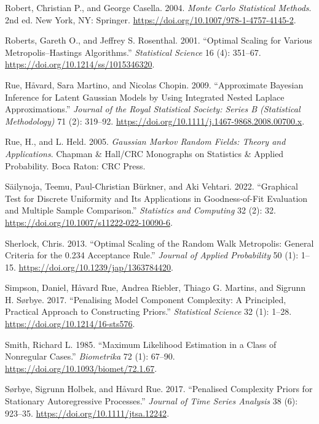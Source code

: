 \documentclass[
  11pt,
  letterpaper,
]{scrbook}
\newlength{\cslhangindent}
\newenvironment{CSLReferences}[2] %
 {\begin{list}{}{%
  \setlength{\itemindent}{0pt}
  \setlength{\leftmargin}{0pt}
  \setlength{\parsep}{0pt}
  \ifodd #1
   \setlength{\leftmargin}{\cslhangindent}
   \setlength{\itemindent}{-1\cslhangindent}
  \fi
  \setlength{\itemsep}{#2\baselineskip}}}
 {\end{list}}
\theoremstyle{plain}
\theoremstyle{plain}
\theoremstyle{definition}
\theoremstyle{definition}
\theoremstyle{definition}
\theoremstyle{plain}
\theoremstyle{remark}
\begin{document}
\begin{CSLReferences}{1}{0}
Robert, Christian P., and George Casella. 2004. \emph{{M}onte {C}arlo
Statistical Methods}. 2nd ed. New York, NY: Springer.
\url{https://doi.org/10.1007/978-1-4757-4145-2}.

Roberts, Gareth O., and Jeffrey S. Rosenthal. 2001. {``Optimal Scaling
for Various {M}etropolis--{H}astings Algorithms.''} \emph{Statistical
Science} 16 (4): 351--67. \url{https://doi.org/10.1214/ss/1015346320}.

Rue, Håvard, Sara Martino, and Nicolas Chopin. 2009. {``Approximate
Bayesian Inference for Latent {G}aussian Models by Using Integrated
Nested {L}aplace Approximations.''} \emph{Journal of the Royal
Statistical Society: Series B (Statistical Methodology)} 71 (2):
319--92. \url{https://doi.org/10.1111/j.1467-9868.2008.00700.x}.

Rue, H., and L. Held. 2005. \emph{{G}aussian {M}arkov Random Fields:
Theory and Applications}. Chapman \& Hall/CRC Monographs on Statistics
\& Applied Probability. Boca Raton: CRC Press.

Säilynoja, Teemu, Paul-Christian Bürkner, and Aki Vehtari. 2022.
{``Graphical Test for Discrete Uniformity and Its Applications in
Goodness-of-Fit Evaluation and Multiple Sample Comparison.''}
\emph{Statistics and Computing} 32 (2): 32.
\url{https://doi.org/10.1007/s11222-022-10090-6}.

Sherlock, Chris. 2013. {``Optimal Scaling of the Random Walk
{M}etropolis: General Criteria for the 0.234 Acceptance Rule.''}
\emph{Journal of Applied Probability} 50 (1): 1--15.
\url{https://doi.org/10.1239/jap/1363784420}.

Simpson, Daniel, Håvard Rue, Andrea Riebler, Thiago G. Martins, and
Sigrunn H. Sørbye. 2017. {``Penalising Model Component Complexity: A
Principled, Practical Approach to Constructing Priors.''}
\emph{Statistical Science} 32 (1): 1--28.
\url{https://doi.org/10.1214/16-sts576}.

Smith, Richard L. 1985. {``Maximum Likelihood Estimation in a Class of
Nonregular Cases.''} \emph{Biometrika} 72 (1): 67--90.
\url{https://doi.org/10.1093/biomet/72.1.67}.

Sørbye, Sigrunn Holbek, and Håvard Rue. 2017. {``Penalised Complexity
Priors for Stationary Autoregressive Processes.''} \emph{Journal of Time
Series Analysis} 38 (6): 923--35.
\url{https://doi.org/10.1111/jtsa.12242}.


\end{CSLReferences}
\end{document}
